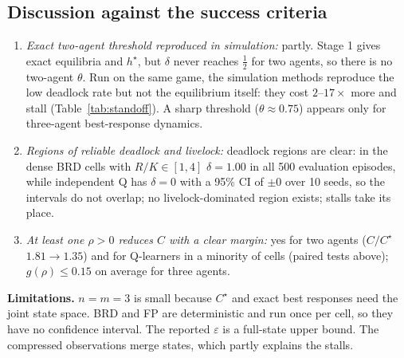 \documentclass[10pt]{article}
\begin{document}
\subsection{Discussion against the success criteria}
\begin{enumerate}
\item \emph{Exact two-agent threshold reproduced in simulation:} partly. Stage 1 gives exact equilibria and $h^\star$, but
$\delta$ never reaches $\tfrac12$ for two agents, so there is no two-agent $\theta$. Run on the same game, the simulation
methods reproduce the low deadlock rate but not the equilibrium itself: they cost $2$--$17\times$ more and stall
(Table~\ref{tab:standoff}). A sharp threshold ($\theta\approx0.75$) appears only for three-agent best-response
dynamics.
\item \emph{Regions of reliable deadlock and livelock:} deadlock regions are clear: in the dense BRD cells with $R/K\in[1,4]$
$\delta=1.00$ in all 500 evaluation episodes, while independent Q has $\delta=0$ with a 95\% CI of $\pm0$ over 10 seeds,
so the intervals do not overlap; no livelock-dominated region exists; stalls take its place.
\item \emph{At least one $\rho>0$ reduces $C$ with a clear margin:} yes for two agents ($C/C^\star$ $1.81\to1.35$) and for
Q-learners in a minority of cells (paired tests above); $g(\rho)\le0.15$ on average for three agents.
\end{enumerate}
\textbf{Limitations.} $n=m=3$ is small because $C^\star$ and exact best responses need the joint state space. BRD and
FP are deterministic and run once per cell, so they have no confidence interval. The reported $\varepsilon$ is a full-state
upper bound. The compressed observations merge states, which partly explains the stalls.
\end{document}
